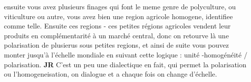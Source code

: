 \documentclass[12pt]{article}
\begin{document}
ensuite vous avez plusieurs finages qui font le meme genre de polyculture, ou viticulture ou autre, vous avez bien une region agricole homogene, identifiee comme telle. Ensuite ces regions - ces petites régions agricoles vendent leur produits en complémentarité à un marché central, donc on retourve là une polarisation de plusierus sous petites regions, et ainsi de suite vous pouvez monter jusqu'à l'échelle mondiale en suivant cette logique : unité -homogénéité / polarisation. \textbf{JR} C'est un peu une dialectique en fait, qui permet la polarisation ou l'homogeneisation, on dialogue et a chaque fois on change d'échelle.
\end{document}
